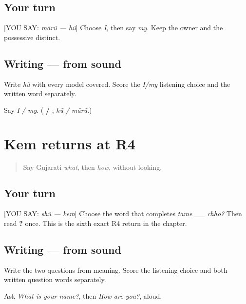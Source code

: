 \subsection*{Your turn}
{[}YOU SAY: \emph{mārũ — hũ}{]} Choose \emph{I}, then say \emph{my}. Keep the owner and the possessive distinct.

\subsection*{Writing — from sound}
Write \emph{hũ} with every model covered. Score the \emph{I/my} listening choice and the written word separately.

\begin{tcolorbox}[breakable,colback=teal!4,colframe=teal!35!black,title={Before you move on}]
Say \emph{I / my}. (\textbf{ / }, \emph{hũ / mārũ}.)
\end{tcolorbox}
\section[Practice]{Kem returns at R4}

\label{lesson:GU-R17-kem-r4}



\begin{quote}
Say Gujarati \emph{what}, then \emph{how}, without looking.
\end{quote}

\subsection*{Your turn}
{[}YOU SAY: \emph{shũ — kem}{]} Choose the word that completes \emph{tame \_\_ chho?} Then read \textbf{  ?} once. This is the sixth exact R4 return in the chapter.

\subsection*{Writing — from sound}
Write the two questions from meaning. Score the listening choice and both written question words separately.

\begin{tcolorbox}[breakable,colback=teal!4,colframe=teal!35!black,title={Before you move on}]
Ask \emph{What is your name?}, then \emph{How are you?}, aloud.
\end{tcolorbox}
